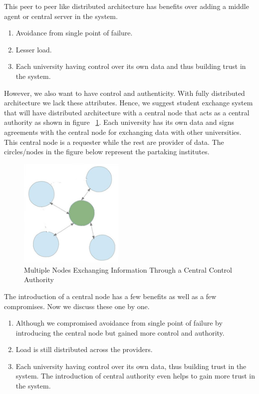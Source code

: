 \documentclass[12pt,a4paper,oneside]{book}
\begin{document}
This peer to peer like distributed architecture has benefits over adding a middle agent or central server in the system.

\begin{enumerate}
\item Avoidance from single point of failure.
\item Lesser load.
\item Each university having control over its own data and thus building trust in the system.	
\end{enumerate}

However, we also want to have control and authenticity. With fully distributed architecture we lack these attributes. Hence, we suggest student exchange system that will have distributed architecture with a central node that acts as a central authority as shown in figure ~\ref{fig:architecture_distributed_exchange_through_hec}. Each university has its own data and signs agreements with the central node for exchanging data with other universities. This central node is a requester while the rest are provider of data. The circles/nodes in the figure below represent the partaking institutes. \\

\begin{figure}[!htp]
  \centering
  \includegraphics[width=5cm]{architecture_distributed_exchange_through_hec.png}
  \caption{Multiple Nodes Exchanging Information Through a Central Control Authority}
  \label{fig:architecture_distributed_exchange_through_hec}
\end{figure}

The introduction of a central node has a few benefits as well as a few compromises. Now we discuss these one by one.

\begin{enumerate}
\item Although we compromised avoidance from single point of failure by introducing the central node but gained more control and authority. 
\item Load is still distributed across the providers.
\item Each university having control over its own data, thus building trust in the system. The introduction of central authority even helps to gain more trust in the system.
\end{enumerate}
\end{document}
